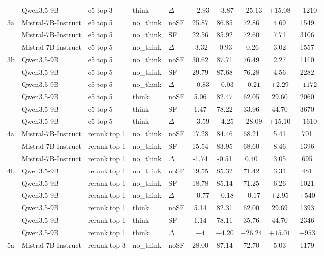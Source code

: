 \begin{scriptsize}
\begin{longtable}{l l l l l c c c c c}
 & Qwen3.5-9B & e5 top 3 & think & $\Delta$ & $-2.93$ & $-3.87$ & $-25.13$ & $+15.08$ & $+1210$ \\
\dmidrule
3a & Mistral-7B-Instruct & e5 top 5 & no\_think & noSF & 25.87 & 86.85 & 72.86 & 4.69 & 1549 \\
 & Mistral-7B-Instruct & e5 top 5 & no\_think & SF & 22.56 & 85.92 & 72.60 & 7.71 & 3106 \\
 & Mistral-7B-Instruct & e5 top 5 & no\_think & $\Delta$ & -3.32 & -0.93 & -0.26 & 3.02 & 1557 \\
3b & Qwen3.5-9B & e5 top 5 & no\_think & noSF & 30.62 & 87.71 & 76.49 & 2.27 & 1110 \\
 & Qwen3.5-9B & e5 top 5 & no\_think & SF & 29.79 & 87.68 & 76.28 & 4.56 & 2282 \\
 & Qwen3.5-9B & e5 top 5 & no\_think & $\Delta$ & $-0.83$ & $-0.03$ & $-0.21$ & $+2.29$ & $+1172$ \\
 & Qwen3.5-9B & e5 top 5 & think & noSF & 5.06 & 82.47 & 62.05 & 29.60 & 2060 \\
 & Qwen3.5-9B & e5 top 5 & think & SF & 1.47 & 78.22 & 33.96 & 44.70 & 3670 \\
 & Qwen3.5-9B & e5 top 5 & think & $\Delta$ & $-3.59$ & $-4.25$ & $-28.09$ & $+15.10$ & $+1610$ \\
\dmidrule
4a & Mistral-7B-Instruct & rerank top 1 & no\_think & noSF & 17.28 & 84.46 & 68.21 & 5.41 & 701 \\
 & Mistral-7B-Instruct & rerank top 1 & no\_think & SF & 15.54 & 83.95 & 68.60 & 8.46 & 1396 \\
 & Mistral-7B-Instruct & rerank top 1 & no\_think & $\Delta$ & -1.74 & -0.51 & 0.40 & 3.05 & 695 \\
4b & Qwen3.5-9B & rerank top 1 & no\_think & noSF & 19.55 & 85.32 & 71.42 & 3.31 & 481 \\
 & Qwen3.5-9B & rerank top 1 & no\_think & SF & 18.78 & 85.14 & 71.25 & 6.26 & 1021 \\
 & Qwen3.5-9B & rerank top 1 & no\_think & $\Delta$ & $-0.77$ & $-0.18$ & $-0.17$ & $+2.95$ & $+540$ \\
 & Qwen3.5-9B & rerank top 1 & think & noSF & 5.14 & 82.31 & 62.00 & 29.69 & 1393 \\
 & Qwen3.5-9B & rerank top 1 & think & SF & 1.14 & 78.11 & 35.76 & 44.70 & 2346 \\
 & Qwen3.5-9B & rerank top 1 & think & $\Delta$ & $-4$ & $-4.20$ & $-26.24$ & $+15.01$ & $+953$ \\
\dmidrule
5a & Mistral-7B-Instruct & rerank top 3 & no\_think & noSF & 28.00 & 87.14 & 72.70 & 5.03 & 1179 \\

\end{longtable}
\end{scriptsize}
